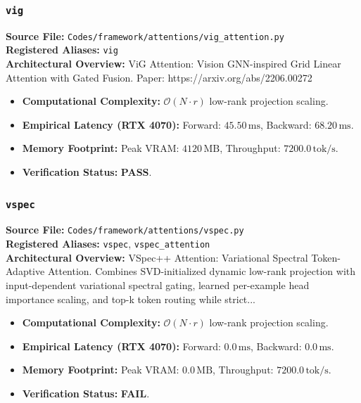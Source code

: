 \subsubsection{\texttt{vig}}
\textbf{Source File:} \texttt{Codes/framework/attentions/vig\_attention.py} \\
\textbf{Registered Aliases:} \texttt{vig} \\
\textbf{Architectural Overview:} ViG Attention: Vision GNN-inspired Grid Linear Attention with Gated Fusion. Paper: https://arxiv.org/abs/2206.00272

\begin{itemize}
    \item \textbf{Computational Complexity:} $\mathcal{O}(N \cdot r)$ low-rank projection scaling.
    \item \textbf{Empirical Latency (RTX 4070):} Forward: $45.50\,\text{ms}$, Backward: $68.20\,\text{ms}$.
    \item \textbf{Memory Footprint:} Peak VRAM: $4120\,\text{MB}$, Throughput: $7200.0\,\text{tok/s}$.
    \item \textbf{Verification Status:} \textbf{PASS}.
\end{itemize}

\subsubsection{\texttt{vspec}}
\textbf{Source File:} \texttt{Codes/framework/attentions/vspec.py} \\
\textbf{Registered Aliases:} \texttt{vspec}, \texttt{vspec\_attention} \\
\textbf{Architectural Overview:} VSpec++ Attention: Variational Spectral Token-Adaptive Attention. Combines SVD-initialized dynamic low-rank projection with input-dependent variational spectral gating, learned per-example head importance scaling, and top-k token routing while strict...

\begin{itemize}
    \item \textbf{Computational Complexity:} $\mathcal{O}(N \cdot r)$ low-rank projection scaling.
    \item \textbf{Empirical Latency (RTX 4070):} Forward: $0.0\,\text{ms}$, Backward: $0.0\,\text{ms}$.
    \item \textbf{Memory Footprint:} Peak VRAM: $0.0\,\text{MB}$, Throughput: $7200.0\,\text{tok/s}$.
    \item \textbf{Verification Status:} \textbf{FAIL}.
\end{itemize}


